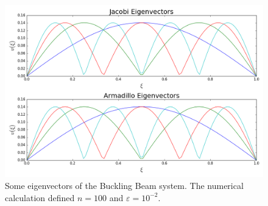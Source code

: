\documentclass[reprint,english]{revtex4-1}
\begin{document}
\begin{figure}[h]
\centering
\includegraphics[scale=0.275]{BucklingBeam/plots/vector100_10.png}
\caption{Some eigenvectors of the Buckling Beam system. The numerical calculation defined \(n=100\) and \(\varepsilon=10^{-2}\).}
\label{fig:bucklingbeam_eigenvectors2}
\end{figure}
\end{document}
